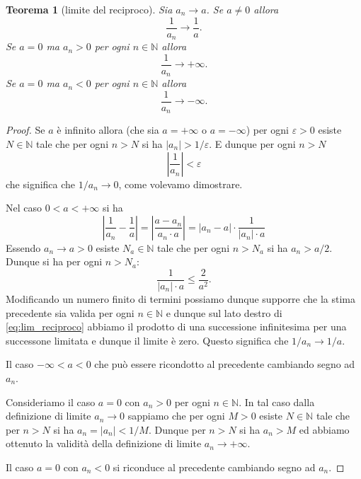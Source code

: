 \documentclass[italian,a4paper,oneside,headinclude]{scrbook}
\newcommand{\eps}{\varepsilon}
\newcommand{\NN}{\mathbb N}
\newcommand{\abs}[1]{{\left|#1\right|}}
\newtheorem{theorem}{Teorema}
\begin{document}
\begin{theorem}[limite del reciproco]
Sia $a_n \to a$.
Se $a\neq 0$ allora
\[
  \frac{1}{a_n} \to \frac{1}{a}.
\]
Se $a = 0$ ma $a_n>0$ per ogni $n\in \NN$ allora
\[
  \frac{1}{a_n} \to +\infty.
\]
Se $a=0$ ma $a_n<0$ per ogni $n\in \NN$ allora
\[
  \frac{1}{a_n} \to -\infty.
\]
\end{theorem}
%
\begin{proof}
Se $a$ è infinito allora
(che sia $a=+\infty$ o $a=-\infty$)
per ogni $\eps > 0$ esiste $N\in \NN$ tale che per ogni $n>N$ si ha
$\abs{a_n} > 1/\eps$. E dunque per ogni $n>N$
\[
\abs{\frac{1}{a_n}} < \eps
\]
che significa che $1/a_n \to 0$, come volevamo dimostrare.

Nel caso $0 < a < +\infty$ si ha
\begin{equation}\label{eq:lim_reciproco}
 \abs{\frac{1}{a_n} - \frac{1}{a}}
 = \abs{\frac{a - a_n}{a_n \cdot a}}
 = \abs{a_n -a} \cdot \frac{1}{\abs{a_n}\cdot a}
\end{equation}
Essendo $a_n \to a > 0$ esiste $N_a\in \NN$ tale
che per ogni $n>N_a$ si ha $a_n > a/2$. Dunque si ha
per ogni $n>N_a$:
\[
\frac{1}{\abs{a_n}\cdot a} \le \frac{2}{a^2}.
\]
Modificando un numero finito di termini possiamo dunque supporre
che la stima precedente sia valida per ogni $n\in \NN$
e dunque sul lato destro di \eqref{eq:lim_reciproco} abbiamo
il prodotto di una successione infinitesima per una successone limitata e dunque il limite è zero. Questo significa che $1/a_n \to 1/a$.

Il caso $-\infty < a < 0$ che può essere ricondotto al precedente cambiando segno ad $a_n$.

Consideriamo il caso $a=0$ con $a_n>0$ per ogni $n\in \NN$. In tal caso
dalla definizione di limite $a_n \to 0$ sappiamo che
per ogni $M>0$ esiste $N\in \NN$ tale che per $n>N$ si ha
$a_n = \abs{a_n} < 1/M$. Dunque per $n>N$ si ha $a_n > M$ ed
abbiamo ottenuto la validità della definizione di limite $a_n \to +\infty$.

Il caso $a=0$ con $a_n<0$ si riconduce al precedente cambiando
segno ad $a_n$.
\end{proof}


% 
% 
\end{document}
